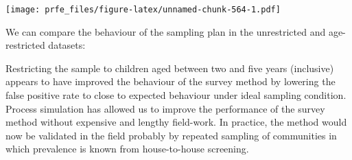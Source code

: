 \documentclass[12pt,a4paper]{book}
\newenvironment{Shaded}{\begin{snugshade}}{\end{snugshade}}
\newcommand{\DataTypeTok}[1]{\textcolor[rgb]{0.13,0.29,0.53}{#1}}
\newcommand{\DecValTok}[1]{\textcolor[rgb]{0.00,0.00,0.81}{#1}}
\newcommand{\FloatTok}[1]{\textcolor[rgb]{0.00,0.00,0.81}{#1}}
\newcommand{\KeywordTok}[1]{\textcolor[rgb]{0.13,0.29,0.53}{\textbf{#1}}}
\newcommand{\NormalTok}[1]{#1}
\newcommand{\OperatorTok}[1]{\textcolor[rgb]{0.81,0.36,0.00}{\textbf{#1}}}
\newcommand{\OtherTok}[1]{\textcolor[rgb]{0.56,0.35,0.01}{#1}}
\newcommand{\StringTok}[1]{\textcolor[rgb]{0.31,0.60,0.02}{#1}}
\theoremstyle{definition}
\theoremstyle{definition}
\theoremstyle{definition}
\theoremstyle{remark}
\begin{document}
\texttt{[image: prfe\_files/figure-latex/unnamed-chunk-564-1.pdf]}

We can compare the behaviour of the sampling plan in the unrestricted
and age-restricted datasets:

\begin{Shaded}
\end{Shaded}

Restricting the sample to children aged between two and five years
(inclusive) appears to have improved the behaviour of the survey method
by lowering the false positive rate to close to expected behaviour under
ideal sampling condition. Process simulation has allowed us to improve
the performance of the survey method without expensive and lengthy
field-work. In practice, the method would now be validated in the field
probably by repeated sampling of communities in which prevalence is
known from house-to-house screening.
\end{document}
